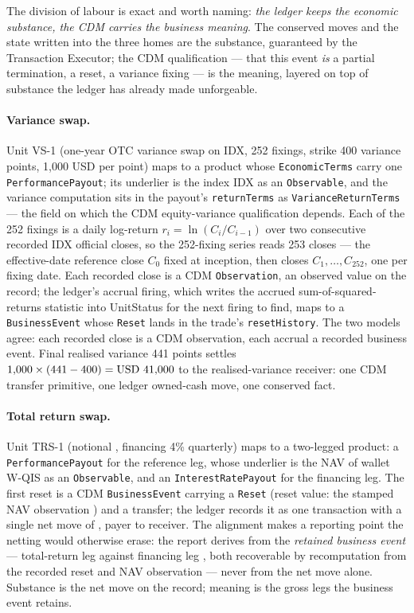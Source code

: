 The division of labour is exact and worth naming: \emph{the ledger keeps the
economic substance, the CDM carries the business meaning}. The conserved moves
and the state written into the three homes are the substance, guaranteed by the
Transaction Executor; the CDM qualification --- that this event \emph{is} a
partial termination, a reset, a variance fixing --- is the meaning, layered on
top of substance the ledger has already made unforgeable.

\paragraph{Variance swap.} Unit VS-1 (one-year OTC variance swap on IDX, 252
fixings, strike 400 variance points, 1{,}000 USD per point) maps to a product
whose \texttt{EconomicTerms} carry one \texttt{PerformancePayout}; its underlier
is the index IDX as an \texttt{Observable}, and the variance computation sits in
the payout's \texttt{returnTerms} as \texttt{VarianceReturnTerms} --- the field on
which the CDM equity-variance qualification depends. Each of the 252 fixings is a daily log-return $r_i = \ln(C_i/C_{i-1})$ over two
consecutive recorded IDX official closes, so the 252-fixing series reads 253
closes --- the effective-date reference close $C_0$ fixed at inception, then
closes $C_1,\dots,C_{252}$, one per fixing date. Each recorded close is a CDM
\texttt{Observation}, an observed value on the record; the ledger's accrual firing, which writes the accrued
sum-of-squared-returns statistic into UnitStatus for the next firing to find,
maps to a \texttt{BusinessEvent} whose \texttt{Reset} lands in the trade's
\texttt{resetHistory}. The two models agree: each recorded close is a CDM observation, each accrual a
recorded business event. Final realised variance 441 points settles $1{,}000 \times (441-400) =
\mbox{USD~41{,}000}$ to the realised-variance receiver: one CDM transfer primitive,
one ledger owned-cash move, one conserved fact.

\paragraph{Total return swap.} Unit TRS-1 (notional ,
financing 4\% quarterly) maps to a two-legged product: a
\texttt{PerformancePayout} for the reference leg, whose underlier is the NAV of
wallet W-QIS as an \texttt{Observable}, and an \texttt{InterestRatePayout} for the
financing leg. The first reset is a CDM \texttt{BusinessEvent} carrying a
\texttt{Reset} (reset value: the stamped NAV observation )
and a transfer; the ledger records it as one transaction with a single net move
of , payer to receiver. The alignment makes a reporting point the
netting would otherwise erase: the report derives from the \emph{retained
business event} --- total-return leg  against financing leg
, both recoverable by recomputation from the recorded reset and
NAV observation --- never from the  net move alone. Substance is
the net move on the record; meaning is the gross legs the business event retains.

